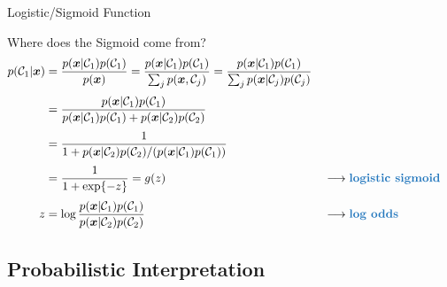\begin{frame}{Logistic/Sigmoid Function}{}
\end{frame}


\begin{frame}{Where does the Sigmoid come from?}{}\optional
	{\footnotesize
	\begin{alignat}{2}
		p(\mathcal{C}_1 \vert \bm{x})
			&=	\frac{p(\bm{x} \vert \mathcal{C}_1) p(\mathcal{C}_1)}{p(\bm{x})}
				= \frac{p(\bm{x} \vert \mathcal{C}_1) p(\mathcal{C}_1)}{\sum_j p(\bm{x}, \mathcal{C}_j)}
				= \frac{p(\bm{x} \vert \mathcal{C}_1) p(\mathcal{C}_1)}{\sum_j p(\bm{x} \vert \mathcal{C}_j) p(\mathcal{C}_j)}
			\\[1mm]
			&= \frac{p(\bm{x} \vert \mathcal{C}_1) p(\mathcal{C}_1)}{
				p(\bm{x} \vert \mathcal{C}_1) p(\mathcal{C}_1) + p(\bm{x} \vert \mathcal{C}_2) p(\mathcal{C}_2)}
			\\[1mm]
			&= \frac{1}{1 + p(\bm{x} \vert \mathcal{C}_2) p(\mathcal{C}_2) / (p(\bm{x} \vert \mathcal{C}_1) p(\mathcal{C}_1))}
			\\[1mm]
			&= \frac{1}{1 + \exp\{ -z \}} = g(z) && \longrightarrow \text{\highlight{logistic sigmoid}}
			\\[1mm]
		z 	&= \log \frac{p(\bm{x} \vert \mathcal{C}_1) p(\mathcal{C}_1)}{p(\bm{x} \vert \mathcal{C}_2) p(\mathcal{C}_2)}
			&& \longrightarrow \text{\highlight{log odds}}
	\end{alignat}}
\end{frame}


\subsection{Probabilistic Interpretation}

